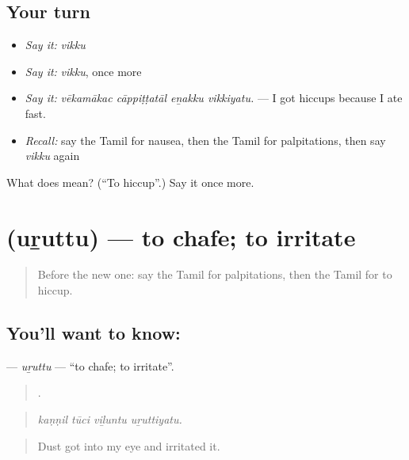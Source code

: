 \subsection*{Your turn}
\begin{itemize}
\raggedright
  \item \emph{Say it:} \emph{vikku}
  \item \emph{Say it:} \emph{vikku}, once more
  \item \emph{Say it:} \emph{vēkamākac cāppiṭṭatāl eṉakku vikkiyatu.} — I got hiccups because I ate fast.
  \item \emph{Recall:} say the Tamil for nausea, then the Tamil for palpitations, then say \emph{vikku} again
\end{itemize}

\begin{tcolorbox}[breakable,colback=teal!4,colframe=teal!35!black,title={Before you move on}]
What does  mean? (\textquotedblleft{}To hiccup\textquotedblright{}.) Say it once more.
\end{tcolorbox}
\section[\texorpdfstring{\ta{உறுத்து} (uṟuttu)}{உறுத்து (uṟuttu)}]{ (uṟuttu) — to chafe; to irritate}

\label{lesson:TA-C474-uruttu-chafe}



\begin{quote}
Before the new one: say the Tamil for palpitations, then the Tamil for to hiccup.
\end{quote}

\subsection*{You'll want to know: }
\textbf{} — \emph{uṟuttu} — \textquotedblleft{}to chafe; to irritate\textquotedblright{}.

\begin{quote}
   .
\end{quote}

\begin{quote}
\emph{kaṇṇil tūci viḻuntu uṟuttiyatu.}
\end{quote}

\begin{quote}
Dust got into my eye and irritated it.
\end{quote}

